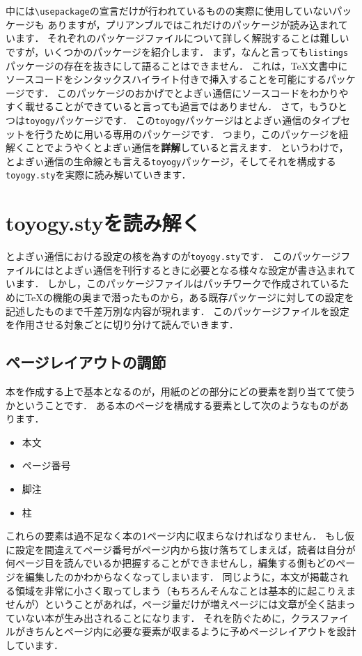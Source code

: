 中には\verb|\usepackage|の宣言だけが行われているものの実際に使用していないパッケージも
ありますが，プリアンブルではこれだけのパッケージが読み込まれています．
それぞれのパッケージファイルについて詳しく解説することは難しいですが，いくつかのパッケージを紹介します．
まず，なんと言っても\verb|listings|パッケージの存在を抜きにして語ることはできません．
これは，{\TeX}文書中にソースコードをシンタックスハイライト付きで挿入することを可能にするパッケージです．
このパッケージのおかげでとよぎぃ通信にソースコードをわかりやすく載せることができていると言っても過言ではありません．
さて，もうひとつは\verb|toyogy|パッケージです．
この\verb|toyogy|パッケージはとよぎぃ通信のタイプセットを行うために用いる専用のパッケージです．
つまり，このパッケージを紐解くことでようやくとよぎぃ通信を\textbf{詳解}していると言えます．
というわけで，とよぎぃ通信の生命線とも言える\verb|toyogy|パッケージ，そしてそれを構成する\verb|toyogy.sty|を実際に読み解いていきます．

\section{toyogy.styを読み解く}

とよぎぃ通信における設定の核を為すのが\texttt{toyogy.sty}です．
このパッケージファイルにはとよぎぃ通信を刊行するときに必要となる様々な設定が書き込まれています．
しかし，このパッケージファイルはパッチワークで作成されているために{\TeX}の機能の奥まで潜ったものから，ある既存パッケージに対しての設定を記述したものまで千差万別な内容が現れます．
このパッケージファイルを設定を作用させる対象ごとに切り分けて読んでいきます．

\subsection{ページレイアウトの調節}

本を作成する上で基本となるのが，用紙のどの部分にどの要素を割り当てて使うかということです．
ある本のページを構成する要素として次のようなものがあります．

\begin{itemize}
	\item 本文
	\item ページ番号
	\item 脚注
	\item 柱
\end{itemize}

これらの要素は過不足なく本の1ページ内に収まらなければなりません．
もし仮に設定を間違えてページ番号がページ内から抜け落ちてしまえば，読者は自分が何ページ目を読んでいるか把握することができませんし，編集する側もどのページを編集したのかわからなくなってしまいます．
同じように，本文が掲載される領域を非常に小さく取ってしまう（もちろんそんなことは基本的に起こりえませんが）ということがあれば，ページ量だけが増えページには文章が全く詰まっていない本が生み出されることになります．
それを防ぐために，クラスファイルがきちんとページ内に必要な要素が収まるように予めページレイアウトを設計しています．

